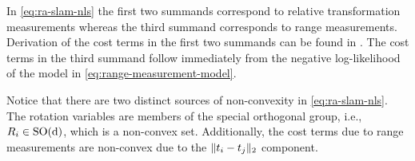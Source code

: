 In \cref{eq:ra-slam-nls} the first two summands correspond to relative
transformation measurements whereas the third summand corresponds to
range measurements. Derivation of the cost terms in the first two summands can
be found in \cite{rosen19ijrr}. The cost terms in the third summand follow
immediately from the negative log-likelihood of the model in
\cref{eq:range-measurement-model}.

Notice that there are two distinct sources of non-convexity in \cref{eq:ra-slam-nls}. The rotation variables are members of the special orthogonal group,
i.e., $R_i \in \operatorname{{\operatorname{SO}}(d)}$, which is a non-convex set. Additionally, the cost terms
due to range measurements are non-convex due to the $ \lVert t_i - t_j
    \rVert_2 $ component.
